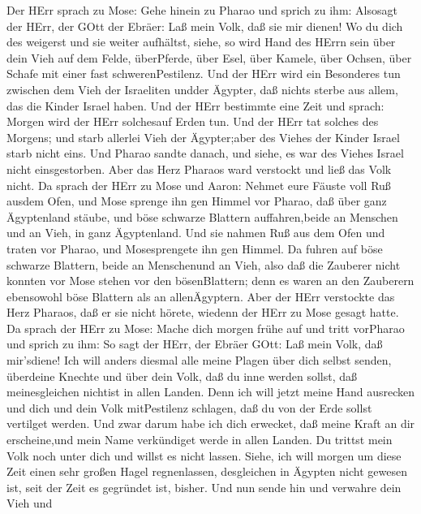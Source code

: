  Der HErr sprach zu Mose: Gehe hinein zu Pharao und sprich
zu ihm: Alsosagt der HErr, der GOtt der Ebräer: Laß mein Volk, daß sie
mir dienen!  Wo du dich des weigerst und sie weiter
aufhältst,  siehe, so wird Hand des HErrn sein über dein
Vieh auf dem Felde, überPferde, über Esel, über Kamele, über Ochsen,
über Schafe mit einer fast schwerenPestilenz.  Und der HErr
wird ein Besonderes tun zwischen dem Vieh der Israeliten undder Ägypter,
daß nichts sterbe aus allem, das die Kinder Israel haben. 
Und der HErr bestimmte eine Zeit und sprach: Morgen wird der HErr
solchesauf Erden tun.  Und der HErr tat solches des Morgens;
und starb allerlei Vieh der Ägypter;aber des Viehes der Kinder Israel
starb nicht eins.  Und Pharao sandte danach, und siehe, es
war des Viehes Israel nicht einsgestorben. Aber das Herz Pharaos ward
verstockt und ließ das Volk nicht.  Da sprach der HErr zu
Mose und Aaron: Nehmet eure Fäuste voll Ruß ausdem Ofen, und Mose
sprenge ihn gen Himmel vor Pharao,  daß über ganz
Ägyptenland stäube, und böse schwarze Blattern auffahren,beide an
Menschen und an Vieh, in ganz Ägyptenland.  Und sie nahmen
Ruß aus dem Ofen und traten vor Pharao, und Mosesprengete ihn gen
Himmel. Da fuhren auf böse schwarze Blattern, beide an Menschenund an
Vieh,  also daß die Zauberer nicht konnten vor Mose stehen
vor den bösenBlattern; denn es waren an den Zauberern ebensowohl böse
Blattern als an allenÄgyptern.  Aber der HErr verstockte
das Herz Pharaos, daß er sie nicht hörete, wiedenn der HErr zu Mose
gesagt hatte.  Da sprach der HErr zu Mose: Mache dich
morgen frühe auf und tritt vorPharao und sprich zu ihm: So sagt der
HErr, der Ebräer GOtt: Laß mein Volk, daß mir'sdiene!  Ich
will anders diesmal alle meine Plagen über dich selbst senden, überdeine
Knechte und über dein Volk, daß du inne werden sollst, daß
meinesgleichen nichtist in allen Landen.  Denn ich will
jetzt meine Hand ausrecken und dich und dein Volk mitPestilenz schlagen,
daß du von der Erde sollst vertilget werden.  Und zwar
darum habe ich dich erwecket, daß meine Kraft an dir erscheine,und mein
Name verkündiget werde in allen Landen.  Du trittst mein
Volk noch unter dich und willst es nicht lassen.  Siehe,
ich will morgen um diese Zeit einen sehr großen Hagel regnenlassen,
desgleichen in Ägypten nicht gewesen ist, seit der Zeit es gegründet
ist, bisher.  Und nun sende hin und verwahre dein Vieh und
